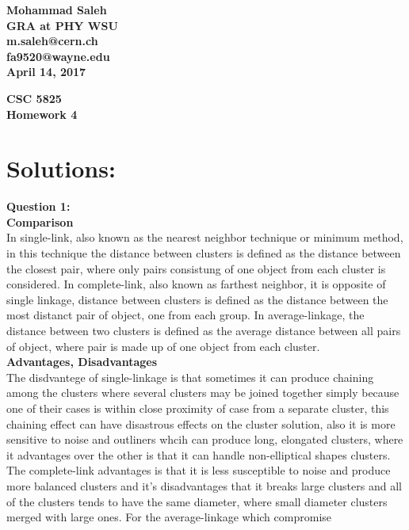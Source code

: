 \documentclass{article}
\begin{document}

\begin{flushright}
\textbf{Mohammad Saleh\\
GRA at PHY WSU\\
m.saleh@cern.ch\\ fa9520@wayne.edu\\
April 14, 2017}
\end{flushright}

\begin{center}
\textbf{CSC 5825 \\
Homework  4} \\
\end{center}

\section*{Solutions:}
\textbf{Question 1:}
\newline
\\
\textbf{Comparison}\\
In single-link, also known as the nearest neighbor technique or minimum method, in this
technique the distance between clusters is defined as the distance
between the closest pair, where only pairs consistung of one object
from each cluster is considered. In complete-link, also known as farthest
neighbor, it is opposite of single linkage, distance between clusters is
 defined as the distance between the most distanct pair of object, one from
  each group. In average-linkage, the distance between two clusters is defined
   as the average distance between all pairs of object, where pair is made up
    of one object from each cluster.\\
\textbf{Advantages, Disadvantages}\\
The disdvantege of single-linkage is that sometimes it can produce chaining
among the clusters where several clusters may be joined together simply because one of their
cases is within close proximity of case from a separate
cluster, this chaining effect can have disastrous
effects on the cluster solution, also it is more sensitive to noise and
outliners whcih can produce long, elongated clusters, where it advantages
over the other is that it can handle non-elliptical shapes clusters. The
complete-link advantages is that it is less susceptible to noise and produce
 more balanced clusters and it's disadvantages that it breaks large clusters
 and all of the clusters tends to have the same diameter, where small diameter
  clusters merged with large ones. For the average-linkage which compromise
\end{document}
